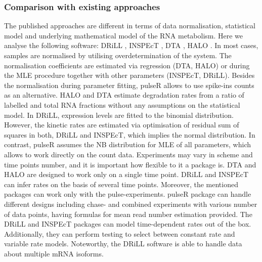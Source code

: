 \subsubsection*{Comparison with existing approaches}
The published approaches are different in terms of 
data normalisation, statistical model and underlying mathematical model of the 
RNA metabolism. Here we analyse the following software:
DRiLL \citep{rabani2014high},
INSPEcT \citep{de2015inspect},
DTA \citep{schwalb2012measurement},
HALO \citep{friedel2010halo}.
In most cases, samples are normalised by utilising overdetermination of the system.
The normalisation coefficients are estimated via regression
(DTA, HALO) or during the MLE procedure together  
with other parameters (INSPEcT, DRiLL). 
Besides the normalisation during parameter fitting, 
pulseR allows to use spike-ins counts as an alternative.
HALO and DTA estimate degradation rates from a ratio of labelled and
total RNA fractions without any assumptions on the statistical model.
In DRiLL, expression levels are fitted to the binomial distribution. 
However, the kinetic rates are estimated via
optimisation of residual sum of squares in both, DRiLL and 
INSPEcT,
which implies the normal distribution. 
In contrast,  pulseR assumes the NB distribution
for MLE of  all  parameters,
which allows to work directly on the count data.
Experiments may vary in scheme and time points number,
and it is important how flexible to it a package is.
 DTA and HALO are designed to work only on a single time
point. DRiLL and INSPEcT can infer rates on the basis of several time points.
Moreover, the mentioned packages can work only with  the pulse-experiments.
pulseR package can handle different designs including chase- and combined 
experiments with various number of data points,
having formulas for mean read number estimation provided.	
The DRiLL and INSPEcT packages can model 
time-dependent rates out of the box. Additionally, they can perform testing
to select between constant rate and variable rate models.
Noteworthy, the DRiLL software is able to handle data about multiple mRNA isoforms.
